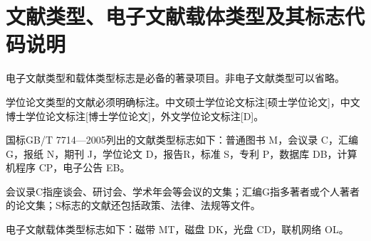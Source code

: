 \section{文献类型、电子文献载体类型及其标志代码说明}

电子文献类型和载体类型标志是必备的著录项目。非电子文献类型可以省略。

学位论文类型的文献必须明确标注。中文硕士学位论文标注[硕士学位论文]，中文博士学位论文标注[博士学位论文]，外文学位论文标注[D]。

国标GB/T 7714—2005列出的文献类型标志如下：普通图书 M，会议录 C，汇编 G，报纸 N，期刊 J，学位论文 D，报告R，标准 S，专利 P，数据库 DB，计算机程序 CP，电子公告 EB。

会议录C指座谈会、研讨会、学术年会等会议的文集；汇编G指多著者或个人著者的论文集；S标志的文献还包括政策、法律、法规等文件。

电子文献载体类型标志如下：磁带 MT，磁盘 DK，光盘 CD，联机网络 OL。